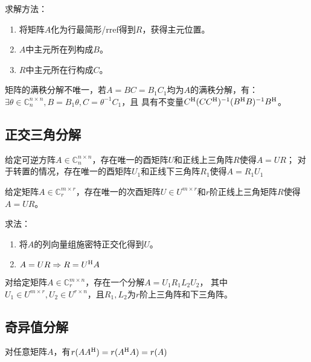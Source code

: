 求解方法：
\begin{enumerate}
    \item 将矩阵$A$化为行最简形/rref得到$R$，获得主元位置。
    \item $A$中主元所在列构成$B$。
    \item $R$中主元所在行构成$C$。
\end{enumerate}

\begin{theorem}
    矩阵的满秩分解不唯一，若$A=BC=B_1 C_1$均为$A$的满秩分解，有：
    $\exists \theta\in \mathbb{C}^{n\times n}_n, B=B_1 \theta, C=\theta^{-1} C_1$，且
    具有不变量$C^\mathrm{H}(C C^\mathrm{H})^{-1} (B^\mathrm{H} B)^{-1} B^\mathrm{H}$。
\end{theorem}

\subsection{正交三角分解}

\begin{definition}[正交三角分解]
    给定可逆方阵$A\in \mathbb{C}^{n\times n}_n$，存在唯一的酉矩阵$U$和正线上三角阵$R$使得$A=UR$；
    对于转置的情况，存在唯一的酉矩阵$U_1$和正线下三角阵$R_1$使得$A=R_1 U_1$
\end{definition}

\begin{theorem}
    给定矩阵$A\in \mathbb{C}^{m\times r}_r$，存在唯一的次酉矩阵$U\in U^{m\times r}$和$r$阶正线上三角矩阵$R$使得$A=UR$。
\end{theorem}

求法：
\begin{enumerate}
    \item 将$A$的列向量组施密特正交化得到$U$。
    \item $A=UR\Rightarrow R=U^\mathrm{H} A$
\end{enumerate}

\begin{corollary}
    对给定矩阵$A\in \mathbb{C}^{m\times n}_r$，存在一个分解$A=U_1 R_1 L_2 U_2$，
    其中$U_1\in U^{m\times r},U_2\in U^{r\times n}$，且$R_1,L_2$为$r$阶上三角阵和下三角阵。
\end{corollary}

\subsection{奇异值分解}

\begin{lemma}
    对任意矩阵$A$，有$r(AA^\mathrm{H})=r(A^\mathrm{H} A)=r(A)$
\end{lemma}


